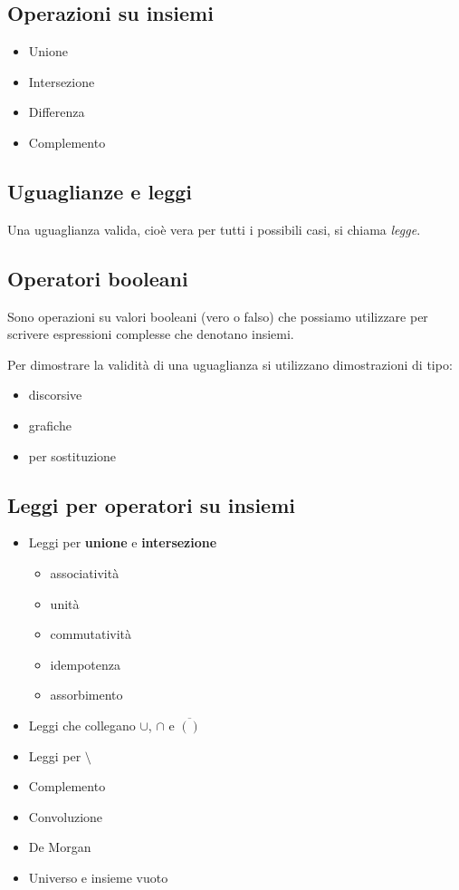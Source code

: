 \documentclass{article}
\begin{document}
\subsection{Operazioni su insiemi}
\begin{itemize}
    \item Unione
    \item Intersezione
    \item Differenza
    \item Complemento
\end{itemize}

\subsection{Uguaglianze e leggi}
Una uguaglianza valida, cioè vera per tutti i possibili casi, si chiama \emph{legge}.

\subsection{Operatori booleani}
Sono operazioni su valori booleani (vero o falso) che possiamo utilizzare per scrivere espressioni complesse che denotano insiemi.

Per dimostrare la validità di una uguaglianza si utilizzano dimostrazioni di tipo:
\begin{itemize}
    \item discorsive
    \item grafiche
    \item per sostituzione
\end{itemize}

\subsection{Leggi per operatori su insiemi}
\begin{itemize}
    \item Leggi per \textbf{unione} e \textbf{intersezione}
          \begin{itemize}
              \item associatività
              \item unità
              \item commutatività
              \item idempotenza
              \item assorbimento
          \end{itemize}
    \item Leggi che collegano \(\cup\), \(\cap\) e \(\overline{()}\)
    \item Leggi per \(\setminus\)
    \item Complemento
    \item Convoluzione
    \item De Morgan
    \item Universo e insieme vuoto
\end{itemize}
\end{document}
